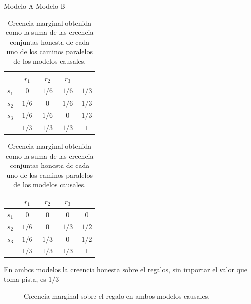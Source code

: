 \documentclass[a4paper,10pt]{book}
\theoremstyle{definition}
\begin{document}
\begin{table}[H]
\centering
Modelo A  \hspace{4.5cm}  Modelo B \\[0.1cm]
 \begin{tabular}{|c|c|c|c||c|} \hline \setlength\tabcolsep{0.4cm}
       & \, $r_1$ \, &  \, $r_2$ \, & \, $r_3$ \, & \\ \hline 
  $s_1$ & $0$ & $1/6$ & $1/6$ & $1/3$ \\ \hline
  $s_2$ & $1/6$ & $0$ & $1/6$ & $1/3$ \\ \hline
  $s_3$ & $1/6$ & $1/6$ & $0$ & $1/3$ \\ \hline \hline
   & $1/3$ & $1/3$ & $1/3$ & $1$ \\ \hline 
  \end{tabular}
  \hspace{1.5cm}
  \begin{tabular}{|c|c|c|c||c|} \hline  \setlength\tabcolsep{0.4cm} 
 & \, $r_1$ \, &  \, $r_2$ \, & \, $r_3$ \, & \\ \hline 
  $s_1$ & $0$ & $0$ & $0$ & $0$\\ \hline
  $s_2$ & $1/6$ & $0$ & $1/3$ & $1/2$ \\ \hline
  $s_3$ & $1/6$ & $1/3$ & $0$ & $1/2$ \\ \hline \hline
   & $1/3$ & $1/3$ & $1/3$ & $1$  \\ \hline
  \end{tabular}
  \caption{Creencia marginal obtenida como la suma de las creencia conjuntas honesta de cada uno de los caminos paralelos de los modelos causales. }
  \label{tab:creencia_marginal}
\end{table}

En ambos modelos la creencia honesta sobre el regalos, sin importar el valor que toma pista, es $1/3$
%
\begin{figure}[H]
\centering
{} 
\caption{Creencia marginal sobre el regalo en ambos modelos causales. }
\end{figure}
\end{document}
